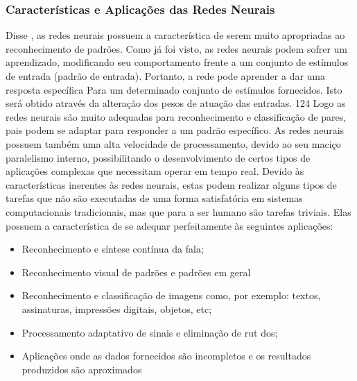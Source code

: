 		\subsubsection{Características e Aplicações das Redes Neurais}
		
			Disse \cite{nunes2004seleccao}, as redes neurais possuem a característica de serem muito apropriadas ao reconhecimento de padrões. Como já foi visto, as redes neurais podem sofrer um aprendizado, modificando seu comportamento frente a um conjunto de estímulos de entrada (padrão de entrada). Portanto, a rede pode aprender a dar uma resposta específica Para um determinado conjunto de estímulos fornecidos. Isto será obtido através da alteração dos pesos de atuação das entradas. 124 Logo as redes neurais são muito adequadas para reconhecimento e classificação de pares, pais podem se adaptar para responder a um padrão específico. As redes neurais possuem também uma alta velocidade de processamento, devido ao seu maciço paralelismo interno, possibilitando o desenvolvimento de certos tipos de aplicações complexas que necessitam operar em tempo real. Devido às características inerentes às redes neurais, estas podem realizar alguns tipos de tarefas que não são executadas de uma forma satisfatória em sistemas computacionais tradicionais, mas que para a ser humano são tarefas triviais. Elas possuem a característica de se adequar perfeitamente às seguintes aplicações:
			
			\begin{itemize}
				\item Reconhecimento e síntese contínua da fala;
				\item Reconhecimento visual de padrões e padrões em geral 
				\item Reconhecimento e classificação de imagens como, por exemplo: textos, assinaturas, impressões digitais, objetos, etc;
				\item Processamento adaptativo de sinais e eliminação de rut dos;
				\item Aplicações onde as dados fornecidos são incompletos e os resultados produzidos são aproximados
			\end{itemize}
